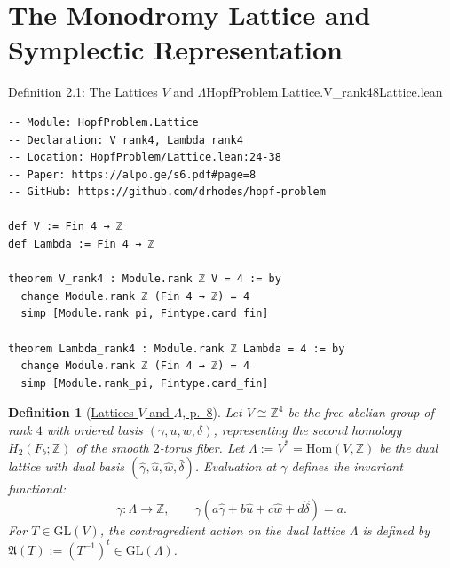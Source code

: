 \documentclass[10pt]{article}
\newtheorem{definition}[theorem]{Definition}
\newcommand{\dbZ}{\mathbb{Z}}
\newcommand{\GL}{\mathrm{GL}}
\newcommand{\Hom}{\mathrm{Hom}}
\gdef\hashchar{#}
\newcommand{\paperref}[2]{\href{https://alpo.ge/s6.pdf\hashchar page=#1}{#2}}
\begin{document}
\newpage

\section{The Monodromy Lattice and Symplectic Representation}

\begin{comparativeblock}{Definition 2.1: The Lattices $V$ and $\Lambda$}{HopfProblem.Lattice.V_rank4}{8}{Lattice.lean}
\begin{verbatim}
-- Module: HopfProblem.Lattice
-- Declaration: V_rank4, Lambda_rank4
-- Location: HopfProblem/Lattice.lean:24-38
-- Paper: https://alpo.ge/s6.pdf#page=8
-- GitHub: https://github.com/drhodes/hopf-problem

def V := Fin 4 → ℤ
def Lambda := Fin 4 → ℤ

theorem V_rank4 : Module.rank ℤ V = 4 := by
  change Module.rank ℤ (Fin 4 → ℤ) = 4
  simp [Module.rank_pi, Fintype.card_fin]

theorem Lambda_rank4 : Module.rank ℤ Lambda = 4 := by
  change Module.rank ℤ (Fin 4 → ℤ) = 4
  simp [Module.rank_pi, Fintype.card_fin]
\end{verbatim}
\tcblower
\begin{definition}[\paperref{8}{Lattices $V$ and $\Lambda$, p.~8}]\label{def:lattices}
Let $V \cong \dbZ^4$ be the free abelian group of rank $4$ with ordered basis $(\gamma, u, w, \delta)$, representing the second homology $H_2(F_b;\dbZ)$ of the smooth $2$-torus fiber.
Let $\Lambda := V^* = \Hom(V, \dbZ)$ be the dual lattice with dual basis $(\hat\gamma, \hat u, \hat w, \hat\delta)$.
Evaluation at $\gamma$ defines the invariant functional:
\[
\gamma \colon \Lambda \to \dbZ, \qquad \gamma(a\hat\gamma + b\hat u + c\hat w + d\hat\delta) = a.
\]
For $T \in \GL(V)$, the contragredient action on the dual lattice $\Lambda$ is defined by $\mathfrak{A}(T) := (T^{-1})^t \in \GL(\Lambda)$.
\end{definition}
\end{comparativeblock}
\end{document}
